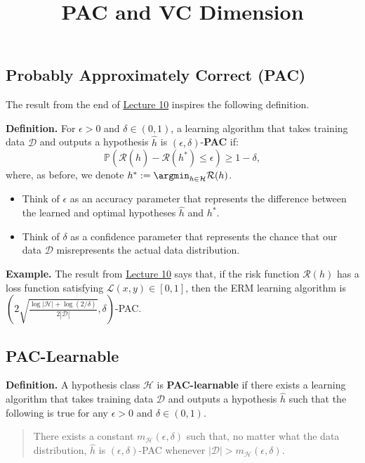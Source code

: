 \title{PAC and VC Dimension}



\subsection{Probably Approximately Correct (PAC)}

The result from the end of
\href{/6.790/lectures/10/#estimation-error-bounding}{Lecture 10}
inspires the following definition.

\textbf{Definition.}
For $\epsilon > 0$ and $\delta \in (0, 1)$,
a learning algorithm that takes training data $\mathcal{D}$
and outputs a hypothesis $\hat{h}$ is
$(\epsilon, \delta)$-\textbf{PAC} if:
\[ \mathbb{P}\left(
    \mathcal{R}(\hat{h}) - \mathcal{R}(h^*) \leq \epsilon
\right) \geq 1 - \delta, \]
where, as before, we denote
$h^* := \argmin_{h \in \mathcal{H}} \mathcal{R}(h)$.
\begin{itemize}
    \item Think of $\epsilon$ as an accuracy parameter
    that represents the difference between
    the learned and optimal hypotheses $\hat{h}$ and $h^*$.
    \item Think of $\delta$ as a confidence parameter
    that represents the chance that our data $\mathcal{D}$
    misrepresents the actual data distribution.
\end{itemize}

\textbf{Example.}
The result from
\href{/6.790/lectures/10/#estimation-error-bounding}{Lecture 10}
says that, if the risk function $\mathcal{R}(h)$
has a loss function satisfying $\mathcal{L}(x, y) \in [0, 1]$,
then the ERM learning algorithm
is $\left(2 
\sqrt{\frac{\log |\mathcal{H}| + \log\left(2 / \delta\right)}{2|\mathcal{D}|}},
\delta \right)$-PAC.

\subsection{PAC-Learnable}

\textbf{Definition.}
A hypothesis class $\mathcal{H}$ is \textbf{PAC-learnable}
if there exists a learning algorithm
that takes training data $\mathcal{D}$
and outputs a hypothesis $\hat{h}$
such that the following is true
for any $\epsilon > 0$ and $\delta \in (0, 1)$.
\begin{quote}
    There exists a constant $m_{\mathcal{H}}(\epsilon, \delta)$
    such that, no matter what the data distribution,
    $\hat{h}$ is $(\epsilon, \delta)$-PAC
    whenever $|\mathcal{D}| > m_{\mathcal{H}}(\epsilon, \delta)$.
\end{quote}

